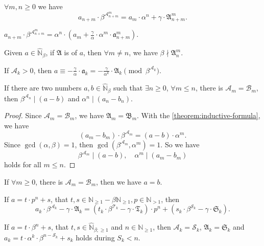 \begin{corollary}
$\forall m, n \ge 0$ we have
\[ a_{n+m} \cdot \beta^{\mathcal{A}_{n+m}^{m}} = a_{m} \cdot\alpha^{n} + \gamma\cdot\mathfrak{A}_{n+m}^{m}. \]
\end{corollary}
\begin{corollary}\label{corollary:inductive-formula-with-reduced}
    $a_{n+m} \cdot \beta^{\mathcal{A}_{n+m}^{m}} = \alpha^{n}\cdot\left(a_m + \frac{\gamma}{\alpha}\cdot\alpha^{m}\cdot\mathfrak{a}_{n+m}^{m}\right)$.
\end{corollary}
\begin{corollary}\label{cor:beta-nmid-collatz-complement}
Given $a\in\widehat{\mathbb{N}}_\beta$, if $\mathfrak{A}$ is of $a$, then $\forall m\ne n$, we have $\beta \nmid \mathfrak{A}_n^m$.
\end{corollary}
\begin{corollary}\label{corollary:congerunce-with-collatz-complement}
If $\mathcal{A}_k > 0$, then $a \equiv - \frac{\gamma}{\alpha}\cdot\mathfrak{a}_k = - \frac{\gamma}{\alpha^k}\cdot\mathfrak{A}_k \pmod{\beta^{\mathcal{A}_k}}$.
\end{corollary}
\begin{corollary}[Co-uniqueness]\label{cor:co-uniqueness}
    If there are two numbers $a, b \in \widehat{\mathbb{N}}_{{\beta}}$ such that $\exists n \ge 0$, $\forall m \le n$, there is $\mathcal{A}_m = \mathcal{B}_m$, then $\beta^{\mathcal{A}_n} \mid (a - b)$ and $\alpha^{n} \mid (a_n - b_n)$.
\end{corollary}
\begin{proof}
    Since $\mathcal{A}_m = \mathcal{B}_m$, we have $\mathfrak{A}_{m} = \mathfrak{B}_{m}$.
    With the \cref{theorem:inductive-formula}, we have
    \[ (a_{m} - b_{m}) \cdot \beta^{\mathcal{A}_m} = (a - b) \cdot \alpha^{m}. \]
    Since $\gcd(\alpha, \beta) = 1$, then $\gcd(\beta^{\mathcal{A}_m}, \alpha^{m}) = 1$.
    So we have
    \[\beta^{\mathcal{A}_m} \mid (a - b), \quad \alpha^{m} \mid (a_m - b_m) \]
    holds for all $m\le n$.
\end{proof}
\begin{corollary}
    If $\forall m \ge 0$, there is $\mathcal{A}_m = \mathcal{B}_m$, then we have $a = b$.
\end{corollary}
\begin{corollary}
    If $a = t \cdot p^n + s$, that $t, s\in \mathbb{N}_{\ge1} - \beta\mathbb{N}_{\ge1}, p \in \mathbb{N}_{>1}$, then
    \[a_k \cdot \beta^{\mathcal{A}_k} - \gamma\cdot\mathfrak{A}_k = (t_k \cdot \beta^{\mathcal{T}_k} - \gamma\cdot\mathfrak{T}_k)\cdot p^{n} + (s_k \cdot \beta^{\mathcal{S}_k} - \gamma\cdot\mathfrak{S}_k).\]
\end{corollary}
\begin{corollary}
    If $a = t \cdot \beta^n + s$, that $t, s \in \widehat{\mathbb{N}}_{\beta;\ge1}$ and $n \in \mathbb{N}_{\ge1}$, then
    $\mathcal{A}_k = \mathcal{S}_k$, $\mathfrak{A}_k = \mathfrak{S}_k$ and $a_k = t \cdot \alpha^{k} \cdot \beta^{n-\mathcal{S}_k} + s_k$ holds during $S_k < n$.
\end{corollary}

